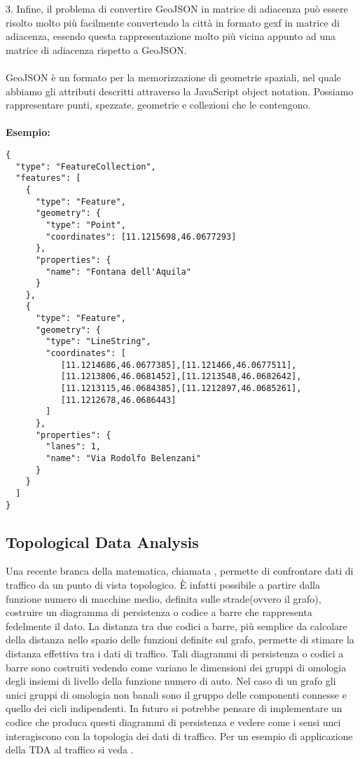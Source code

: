 \documentclass[main.tex]{subfiles}
\begin{document}
3. Infine, il problema di convertire GeoJSON in matrice di adiacenza può essere risolto molto più facilmente convertendo la città in formato gexf in matrice di adiacenza, essendo questa rappresentazione molto più vicina appunto ad una matrice di adiacenza rispetto a GeoJSON.
\\
\\
GeoJSON è un formato per la memorizzazione di geometrie spaziali, nel quale abbiamo gli attributi descritti attraverso la JavaScript object notation.
Possiamo rappresentare punti, spezzate, geometrie e collezioni che le contengono.
\\
\\
\textbf{Esempio:}
\begin{lstlisting}
{
  "type": "FeatureCollection",
  "features": [
    {
      "type": "Feature",
      "geometry": {
        "type": "Point",
        "coordinates": [11.1215698,46.0677293]
      },
      "properties": {
        "name": "Fontana dell'Aquila"
      }
    },
    {
      "type": "Feature",
      "geometry": {
        "type": "LineString",
        "coordinates": [
           [11.1214686,46.0677385],[11.121466,46.0677511],
           [11.1213806,46.0681452],[11.1213548,46.0682642],
           [11.1213115,46.0684385],[11.1212897,46.0685261],
           [11.1212678,46.0686443]
        ]
      },
      "properties": {
        "lanes": 1,
        "name": "Via Rodolfo Belenzani"
      }
    }
  ]
}
\end{lstlisting}

\subsection{Topological Data Analysis}
Una recente branca della matematica, chiamata , permette di confrontare dati di traffico da un punto di vista topologico.
\`{E} infatti possibile a partire dalla funzione numero di macchine medio, definita sulle strade(ovvero il grafo), costruire un diagramma di persistenza o codice a 
barre che rappresenta fedelmente il dato. La distanza tra due codici a barre, più semplice da calcolare della distanza nello spazio delle funzioni definite sul grafo,
permette di stimare la distanza effettiva tra i dati di traffico. Tali diagrammi di persistenza o codici a barre sono costruiti vedendo come variano le dimensioni dei gruppi di omologia
degli insiemi di livello della funzione numero di auto. Nel caso di un grafo gli unici gruppi di omologia non banali sono il gruppo delle componenti connesse e quello dei cicli indipendenti.
In futuro si potrebbe pensare di implementare un codice che produca questi diagrammi di persistenza e vedere come i sensi unci interagiscono con la topologia dei dati di traffico.
Per un esempio di applicazione della TDA al traffico si veda \cite{barcodes}.
\end{document}

